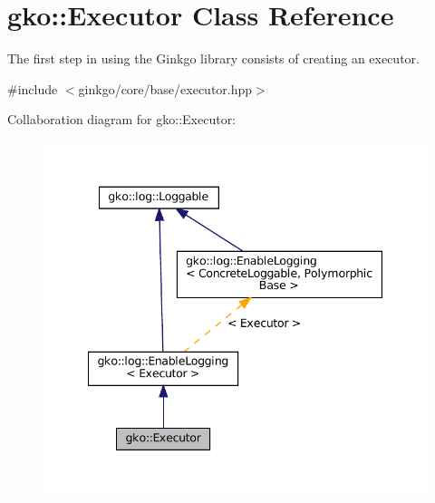 \hypertarget{classgko_1_1Executor}{}\section{gko\+:\+:Executor Class Reference}
\label{classgko_1_1Executor}


The first step in using the Ginkgo library consists of creating an executor.  




{\ttfamily \#include $<$ginkgo/core/base/executor.\+hpp$>$}



Collaboration diagram for gko\+:\+:Executor\+:
\nopagebreak
\begin{figure}[H]
\begin{center}
\leavevmode
\includegraphics[width=341pt]{classgko_1_1Executor__coll__graph}
\end{center}
\end{figure}
